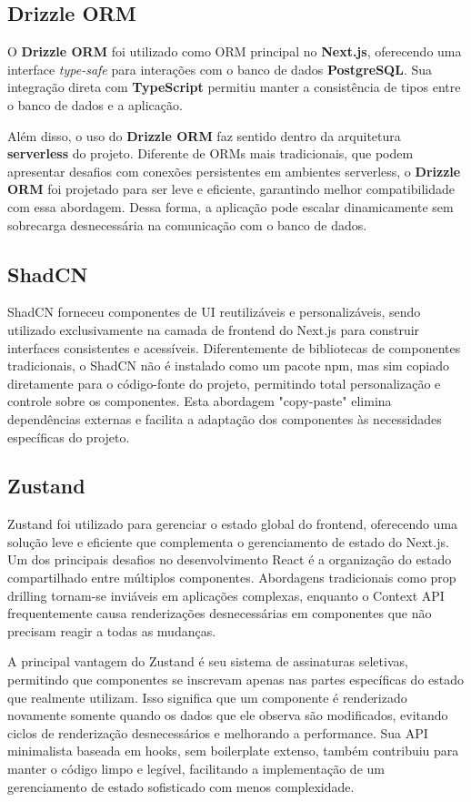 \documentclass[tcc,capa]{texufpel}
\begin{document}
\subsection{Drizzle ORM}

O \textbf{Drizzle ORM} foi utilizado como ORM principal no \textbf{Next.js}, oferecendo uma interface \textit{type-safe} para interações com o banco de dados \textbf{PostgreSQL}. Sua integração direta com \textbf{TypeScript} permitiu manter a consistência de tipos entre o banco de dados e a aplicação.

Além disso, o uso do \textbf{Drizzle ORM} faz sentido dentro da arquitetura \textbf{serverless} do projeto. Diferente de ORMs mais tradicionais, que podem apresentar desafios com conexões persistentes em ambientes serverless, o \textbf{Drizzle ORM} foi projetado para ser leve e eficiente, garantindo melhor compatibilidade com essa abordagem. Dessa forma, a aplicação pode escalar dinamicamente sem sobrecarga desnecessária na comunicação com o banco de dados.


\subsection{ShadCN}
ShadCN forneceu componentes de UI reutilizáveis e personalizáveis, sendo utilizado exclusivamente na camada de frontend do Next.js para construir interfaces consistentes e acessíveis. Diferentemente de bibliotecas de componentes tradicionais, o ShadCN não é instalado como um pacote npm, mas sim copiado diretamente para o código-fonte do projeto, permitindo total personalização e controle sobre os componentes. Esta abordagem "copy-paste" elimina dependências externas e facilita a adaptação dos componentes às necessidades específicas do projeto.

\subsection{Zustand}
Zustand foi utilizado para gerenciar o estado global do frontend, oferecendo uma solução leve e eficiente que complementa o gerenciamento de estado do Next.js. Um dos principais desafios no desenvolvimento React é a organização do estado compartilhado entre múltiplos componentes. Abordagens tradicionais como prop drilling tornam-se inviáveis em aplicações complexas, enquanto o Context API frequentemente causa renderizações desnecessárias em componentes que não precisam reagir a todas as mudanças.

A principal vantagem do Zustand é seu sistema de assinaturas seletivas, permitindo que componentes se inscrevam apenas nas partes específicas do estado que realmente utilizam. Isso significa que um componente é renderizado novamente somente quando os dados que ele observa são modificados, evitando ciclos de renderização desnecessários e melhorando a performance. Sua API minimalista baseada em hooks, sem boilerplate extenso, também contribuiu para manter o código limpo e legível, facilitando a implementação de um gerenciamento de estado sofisticado com menos complexidade.
\end{document}
